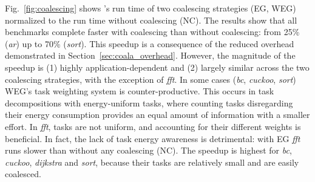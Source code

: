 \begin{table}[t]%

\caption{
}
\label{tab:dif_cap}
\end{table}%

Fig.~\ref{fig:coalescing} shows \sys's run time of two coalescing
strategies (EG, WEG) normalized to the run time without coalescing (NC).
%
The results show that all benchmarks
complete faster with coalescing than without coalescing: from 25\%
(\textit{ar}) up to 70\% (\textit{sort}).
%
This speedup is a consequence of the reduced overhead demonstrated in
Section~\ref{sec:coala_overhead}.
%
However, the magnitude of the speedup is (1) highly application-dependent and
(2) largely similar across the two coalescing strategies, with the exception of
\textit{fft}.
%
In some cases (\textit{bc}, \textit{cuckoo}, \textit{sort}) WEG's task weighting
system is counter-productive.
%
This occurs in task decompositions with energy-uniform tasks, where counting
tasks disregarding their energy consumption provides an equal amount of information
with a smaller effort.
%
In \textit{fft}, tasks are not uniform, and accounting for their different weights is
beneficial. In fact, the lack of task energy awareness is detrimental: with EG
\textit{fft} runs slower than without any coalescing (NC).
%
The speedup is highest for \textit{bc}, \textit{cuckoo}, \textit{dijkstra} and
\textit{sort}, because their tasks are relatively small and are easily coalesced.
%

